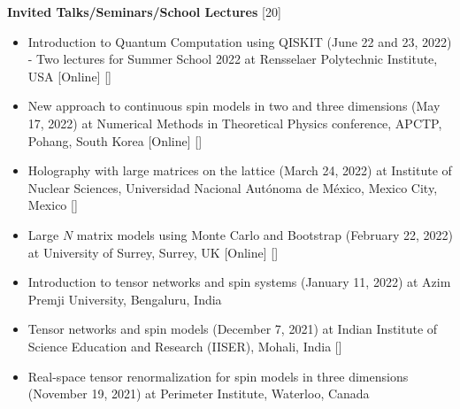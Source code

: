 \vspace{2mm} 
\textcolor{alizarin}{\textbf{\fontsize{10}{38} \bfseries Invited Talks/Seminars/School Lectures} [20]}

\begin{itemize}

 \item Introduction to Quantum Computation using \textsc{QISKIT} (June 22 and 23, 2022) - Two lectures for 
Summer School 2022 at Rensselaer Polytechnic Institute, USA [Online]  
  [] \vspace{1mm} 

 \item New approach to continuous spin models in two and three dimensions
 (May 17, 2022) at Numerical Methods in Theoretical Physics conference, APCTP, Pohang, South Korea [Online]  
 []
 \vspace{1mm} 
 
 \item Holography with large matrices on the lattice (March 24, 2022) at Institute of Nuclear Sciences, 
 Universidad Nacional Aut\'{o}noma de M\'{e}xico, Mexico City, Mexico   
  []
 \vspace{1mm}%
 
\item Large $N$ matrix models using Monte Carlo and Bootstrap
 (February 22, 2022) at University of Surrey, Surrey, UK [Online]  
 []
 \vspace{1mm} 
 
 \item Introduction to tensor networks and spin systems 
 (January 11, 2022) at Azim Premji University, Bengaluru, India  \vspace{1mm} 
 
 \item Tensor networks and spin models 
 (December 7, 2021) at Indian Institute of Science Education and Research (IISER), Mohali, India 
 []  \vspace{1mm} 
 
  \item Real-space tensor renormalization for spin models in three dimensions 
 (November 19, 2021) at Perimeter Institute, Waterloo, Canada \vspace{1mm}  
 

\end{itemize}
